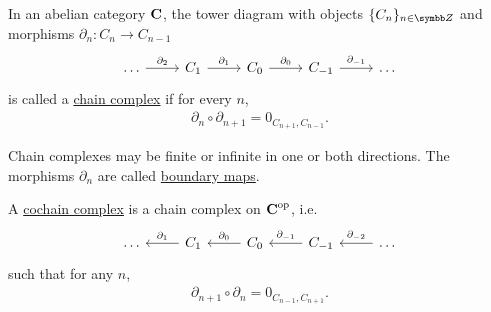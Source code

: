 \begin{definition}\label{def:chain_complex}\cite{nLab:chain_complex}
  In an abelian category $\operatorname{\mathbf{C}}$, the tower diagram with objects $\{ C_n \}_{n \in \BB{Z}}$ and morphisms $\partial_n: C_n \to C_{n-1}$
  \begin{equation}\label{def:chain_complex/chain_diagram}
    \begin{tikzcd}[baseline=(current bounding box.center)]
      \ldots \arrow[r, "\partial_2"] & C_1 \arrow[r, "\partial_1"] & C_0 \arrow[r, "\partial_0"] & C_{-1} \arrow[r, "\partial_{-1}"] & \ldots
    \end{tikzcd}
  \end{equation}
  is called a \ul{chain complex} if for every $n$,
  \begin{align*}
    \partial_n \circ \partial_{n+1} = 0_{C_{n+1},C_{n-1}}.
  \end{align*}

  Chain complexes may be finite or infinite in one or both directions. The morphisms $\partial_n$ are called \ul{boundary maps}.

  A \ul{cochain complex} is a chain complex on $\operatorname{\mathbf{C}}^{\operatorname{op}}$, i.e.
  \begin{equation}\label{def:chain_complex/cochain_diagram}
    \begin{tikzcd}[baseline=(current bounding box.center)]
      \ldots & C_1 \arrow[l, "\partial_1"'] & C_0 \arrow[l, "\partial_0"'] & C_{-1} \arrow[l, "\partial_{-1}"'] & \ldots \arrow[l, "\partial_{-2}"']
    \end{tikzcd}
  \end{equation}
  such that for any $n$,
  \begin{align*}
    \partial_{n+1} \circ \partial_n = 0_{C_{n-1},C_{n+1}}.
  \end{align*}
\end{definition}
